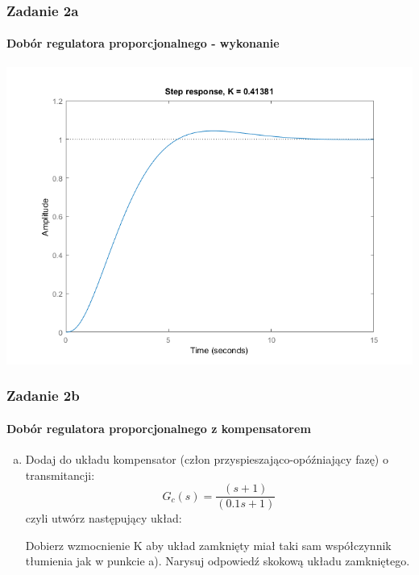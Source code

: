 \documentclass{beamer}
\begin{document}
\begin{frame}\frametitle{Zadanie 2a}\framesubtitle{Dobór regulatora proporcjonalnego - wykonanie}
\centering	\includegraphics[scale=0.5]{a-sys-zamk-k.png}
\end{frame}


\begin{frame}\frametitle{Zadanie 2b}\framesubtitle{Dobór regulatora proporcjonalnego z kompensatorem}
	\begin{enumerate}[b)]
		\item Dodaj do układu kompensator (człon przyspieszająco-opóźniający fazę) o transmitancji:
		\[
			G_c(s) = \frac{(s+1)}{(0.1s+1)}
		\]	
		czyli utwórz następujący układ:
		
		
		
		
		\flushleft Dobierz wzmocnienie K aby układ zamknięty miał taki sam współczynnik tłumienia jak w punkcie a). Narysuj odpowiedź skokową układu zamkniętego.
	\end{enumerate}
\end{frame}
\end{document}
